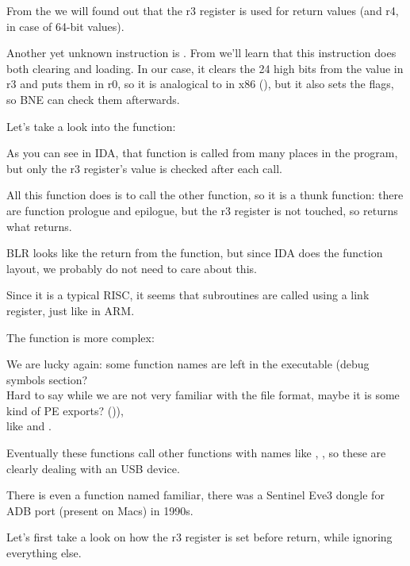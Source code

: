 From the \PPCABI we will found out that the r3 register is used for return values (and r4, in case of 64-bit values).

Another yet unknown instruction is . 
From \PPC we'll learn that this instruction does both clearing and loading. 
In our case, it clears the 24 high bits from the value in r3
and puts them in r0, so it is analogical to \MOVZX in x86 (),
but it also sets the flags, so \ac{BNE} 
can check them afterwards.

Let's take a look into the  function:



As you can see in \ac{IDA}, that function is called from many places in the program, but only the r3 register's value
is checked after each call.

All this function does is to call the other function, so it is a \gls{thunk function}: 
there are function prologue and epilogue, but the r3 register is not touched, so  
returns what  returns.

\ac{BLR} looks like the return from the function, but since \ac{IDA} does the function layout, we probably do not need
to care about this.

Since it is a typical \ac{RISC}, it seems that subroutines are called using a \gls{link register},
just like in ARM.

The  function is more complex:




We are lucky again: some function names are left in the executable 
(debug symbols section? \\
Hard to say while we are not very familiar with the file format, maybe it is
some kind of PE exports? ()),\\
like  and .

Eventually these functions call other functions with names like , 
,
so these are clearly dealing with an USB device.

There is even a function named 
\EMDASHsounds familiar, there was a Sentinel Eve3 
dongle for ADB port (present on Macs) in 1990s.

Let's first take a look on how the r3 register is set before return, while ignoring everything else.

